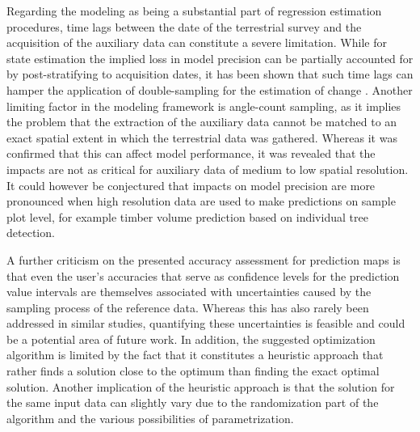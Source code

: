 Regarding the modeling as being a substantial part of regression estimation procedures, time lags between the date of the terrestrial survey and the acquisition of the auxiliary data can constitute a severe limitation. While for state estimation the implied loss in model precision can be partially accounted for by post-stratifying to acquisition dates, it has been shown that such time lags can hamper the application of double-sampling for the estimation of change \citep{massey2015_thesis}. Another limiting factor in the modeling framework is angle-count sampling, as it implies the problem that the extraction of the auxiliary data cannot be matched to an exact spatial extent in which the terrestrial data was gathered. Whereas it was confirmed that this can affect model performance, it was revealed that the impacts are not as critical for auxiliary data of medium to low spatial resolution. It could however be conjectured that impacts on model precision are more pronounced when high resolution data are used to make predictions on sample plot level, for example timber volume prediction based on individual tree detection.\par

A further criticism on the presented accuracy assessment for prediction maps is that even the user's accuracies that serve as confidence levels for the prediction value intervals are themselves associated with uncertainties caused by the sampling process of the reference data. Whereas this has also rarely been addressed in similar studies, quantifying these uncertainties is feasible and could be a potential area of future work. In addition, the suggested optimization algorithm is limited by the fact that it constitutes a heuristic approach that rather finds a solution close to the optimum than finding the exact optimal solution. Another implication of the heuristic approach is that the solution for the same input data can slightly vary due to the randomization part of the algorithm and the various possibilities of parametrization.

